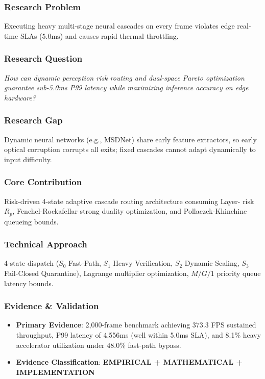 \documentclass[11pt,letterpaper]{article}
\begin{document}
\subsubsection{Research Problem}
Executing heavy multi-\allowbreak stage neural cascades on every frame violates edge real-\allowbreak time SLAs ($5.0\text{ms}$) and causes rapid thermal throttling.

\subsubsection{Research Question}
\begin{tcolorbox}[colback=blue!3!white,colframe=blue!50!black,title=Primary Scientific Question]
\textit{How can dynamic perception risk routing and dual-\allowbreak space Pareto optimization guarantee sub-\allowbreak 5.0ms P99 latency while maximizing inference accuracy on edge hardware?}
\end{tcolorbox}

\subsubsection{Research Gap}
Dynamic neural networks (e.g., MSDNet) share early feature extractors, so early optical corruption corrupts all exits; fixed cascades cannot adapt dynamically to input difficulty.

\subsubsection{Core Contribution}
Risk-\allowbreak driven 4-\allowbreak state adaptive cascade routing architecture consuming Layer- risk $R_p$, Fenchel-\allowbreak Rockafellar strong duality optimization, and Pollaczek-\allowbreak Khinchine queueing bounds.

\subsubsection{Technical Approach}
4-\allowbreak state dispatch ($S_0$ Fast-\allowbreak Path, $S_1$ Heavy Verification, $S_2$ Dynamic Scaling, $S_3$ Fail-\allowbreak Closed Quarantine), Lagrange multiplier optimization, $M/G/1$ priority queue latency bounds.

\subsubsection{Evidence \& Validation}
\begin{itemize}[leftmargin=*]
    \item \textbf{Primary Evidence}: 2,000-\allowbreak frame benchmark achieving 373.3 FPS sustained throughput, P99 latency of 4.556ms (well within 5.0ms SLA), and 8.1\% heavy accelerator utilization under 48.0\% fast-\allowbreak path bypass.
    \item \textbf{Evidence Classification}: \textbf{EMPIRICAL + MATHEMATICAL + IMPLEMENTATION}
\end{itemize}
\end{document}
